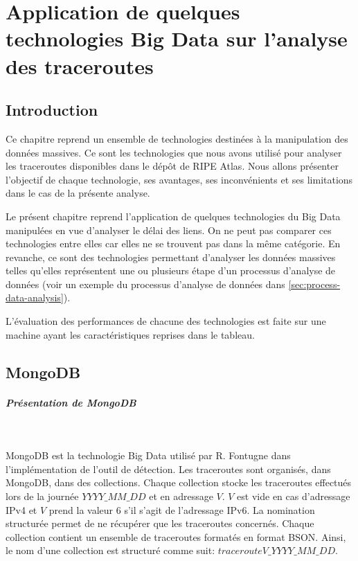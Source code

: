 \chapter{Application de quelques technologies Big Data sur l'analyse des traceroutes}


\section{Introduction}

Ce chapitre reprend un ensemble de   technologies destinées  à la manipulation des données massives. Ce sont les technologies que nous avons utilisé pour analyser les traceroutes disponibles dans le dépôt de RIPE Atlas. Nous allons présenter l'objectif de chaque technologie, ses avantages, ses inconvénients et ses limitations dans le cas de la présente analyse.

Le présent chapitre reprend l'application de quelques technologies du Big Data manipulées en vue d'analyser le délai des liens. On ne peut pas comparer ces technologies entre elles car elles ne se trouvent pas dans la même catégorie. En revanche, ce sont des technologies permettant d'analyser les données massives telles qu'elles représentent une ou plusieurs étape d'un processus d'analyse de données (voir un exemple du processus d'analyse de données dans \ref{sec:process-data-analysis}). 

L'évaluation des performances de chacune des technologies est faite sur une machine ayant les caractéristiques reprises dans le tableau.

\section{MongoDB}
\paragraph{ Présentation de MongoDB}~


MongoDB est la technologie Big Data utilisé par R. Fontugne dans l'implémentation de l'outil de détection. Les traceroutes sont organisés, dans MongoDB, dans des collections.  Chaque collection stocke les traceroutes effectués lors de la journée $YYYY\_MM\_DD$ et en adressage $V$. $V$ est vide en cas d'adressage IPv4 et $V$ prend la valeur $6$ s'il s'agit de l'adressage IPv6. La nomination structurée permet de ne récupérer que les traceroutes concernés. Chaque collection contient un ensemble de traceroutes formatés en format BSON. Ainsi, le nom d'une collection est structuré comme suit: 	$tracerouteV\_YYYY\_MM\_DD$.
 
